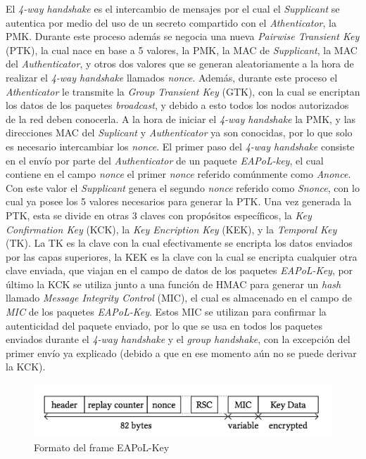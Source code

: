 \documentclass[10pt,a4paper]{article}
\begin{document}
El \textit{4-way handshake} es el intercambio de mensajes por el cual el \textit{Supplicant} se autentica por medio del uso de un secreto compartido con el \textit{Athenticator}, la PMK. Durante este proceso además se negocia una nueva \textit{Pairwise Transient Key} (PTK), la cual nace en base a 5 valores, la PMK, la MAC de \textit{Supplicant}, la MAC del \textit{Authenticator}, y otros dos valores que se generan aleatoriamente a la hora de realizar el \textit{4-way handshake} llamados \textit{nonce}. Además, durante este proceso el \textit{Athenticator} le transmite la \textit{Group Transient Key} (GTK), con la cual se encriptan los datos de los paquetes \textit{broadcast}, y debido a esto todos los nodos autorizados de la red deben conocerla. A la hora de iniciar el \textit{4-way handshake} la PMK, y las direcciones MAC del \textit{Suplicant} y \textit{Authenticator} ya son conocidas, por lo que solo es necesario intercambiar los \textit{nonce}. El primer paso del \textit{4-way handshake} consiste en el envío por parte del \textit{Authenticator} de un paquete \textit{EAPoL-key}, el cual contiene en el campo \textit{nonce} el primer \textit{nonce} referido comúnmente como \textit{Anonce}. Con este valor el \textit{Supplicant} genera el segundo \textit{nonce} referido como \textit{Snonce}, con lo cual ya posee los 5 valores necesarios para generar la PTK.
Una vez generada la PTK, esta se divide en otras 3 claves con propósitos específicos, la \textit{Key Confirmation Key} (KCK), la \textit{Key Encription Key} (KEK), y la \textit{Temporal Key} (TK). La TK es la clave con la cual efectivamente se encripta los datos enviados por las capas superiores, la KEK es la clave con la cual se encripta cualquier otra clave enviada, que viajan en el campo de datos de los paquetes \textit{EAPoL-Key}, por último la KCK se utiliza junto a una función de HMAC para generar un \textit{hash} llamado \textit{Message Integrity Control} (MIC), el cual es almacenado en el campo de \textit{MIC} de los paquetes \textit{EAPoL-Key}. Estos MIC se utilizan para confirmar la autenticidad del paquete enviado, por lo que se usa en todos los paquetes enviados durante el \textit{4-way handshake} y el \textit{group handshake}, con la excepción del primer envío ya explicado (debido a que en ese momento aún no se puede derivar la KCK).

\begin{figure}[H]
\centerline{\includegraphics[scale=0.7]{images/EAPoL_key_format.png}}
\caption{Formato del frame EAPoL-Key}
\end{figure}
\end{document}
